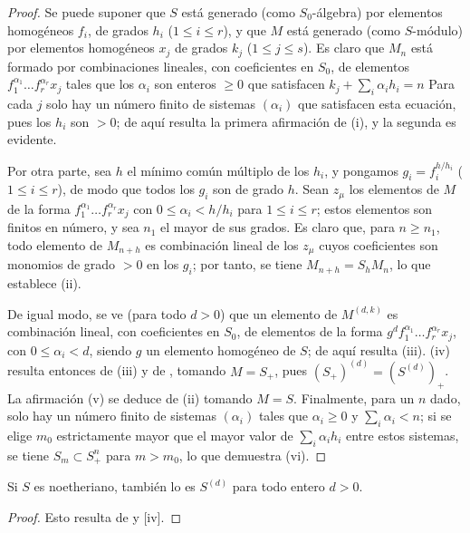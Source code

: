 \documentclass[oneside,10pt]{amsart}
\renewcommand{\leq}{\leqslant}
\renewcommand{\geq}{\geqslant}
\newcommand{\oldpage}[2][]{\marginnote{\normalfont\footnotesize\textbf{#1}~|~#2}\ignorespaces}
\let\EGAOriginalLabel\label
\renewcommand{\label}[1]{\phantomsection\EGAOriginalLabel{#1}}
\begin{document}
\begin{proof}
Se puede suponer que $S$ está generado (como $S_0$-álgebra) por elementos homogéneos $f_i$, de grados $h_i$ ($1\leq i\leq r$), y que $M$ está generado (como $S$-módulo) por elementos homogéneos $x_j$ de grados $k_j$ ($1\leq j\leq s$).
Es claro que $M_n$ está formado por combinaciones lineales,
\oldpage[II]{22}
con coeficientes en $S_0$, de elementos $f_1^{\alpha_1}\ldots f_r^{\alpha_r}x_j$ tales que los $\alpha_i$ son enteros $\geq 0$ que satisfacen
$k_j+\sum_i\alpha_i h_i=n$
Para cada $j$ solo hay un número finito de sistemas $(\alpha_i)$ que satisfacen esta ecuación, pues los $h_i$ son $>0$; de aquí resulta la primera afirmación de (i), y la segunda es evidente.

Por otra parte, sea $h$ el mínimo común múltiplo de los $h_i$, y pongamos $g_i=f_i^{h/h_i}$ ($1\leq i\leq r$), de modo que todos los $g_i$ son de grado $h$.
Sean $z_\mu$ los elementos de $M$ de la forma $f_1^{\alpha_1}\ldots f_r^{\alpha_r}x_j$ con $0\leq\alpha_i<h/h_i$ para $1\leq i\leq r$; estos elementos son finitos en número, y sea $n_1$ el mayor de sus grados.
Es claro que, para $n\geq n_1$, todo elemento de $M_{n+h}$ es combinación lineal de los $z_\mu$ cuyos coeficientes son monomios de grado $>0$ en los $g_i$; por tanto, se tiene $M_{n+h}=S_hM_n$, lo que establece (ii).

De igual modo, se ve (para todo $d>0$) que un elemento de $M^{(d,k)}$ es combinación lineal, con coeficientes en $S_0$, de elementos de la forma $g^df_1^{\alpha_1}\ldots f_r^{\alpha_r}x_j$, con $0\leq\alpha_i<d$, siendo $g$ un elemento homogéneo de $S$; de aquí resulta (iii).
(iv) resulta entonces de (iii) y de , tomando $M=S_+$, pues $(S_+)^{(d)}=(S^{(d)})_+$.
La afirmación (v) se deduce de (ii) tomando $M=S$.
Finalmente, para un $n$ dado, solo hay un número finito de sistemas $(\alpha_i)$ tales que $\alpha_i\geq 0$ y $\sum_i\alpha_i<n$; si se elige $m_0$ estrictamente mayor que el mayor valor de $\sum_i\alpha_i h_i$ entre estos sistemas, se tiene $S_m\subset S_+^n$ para $m>m_0$, lo que demuestra (vi).
\end{proof}

\begin{corollary}[2.1.7]
\label{II.2.1.7-fr}
Si $S$ es noetheriano, también lo es $S^{(d)}$ para todo entero $d>0$.
\end{corollary}

\begin{proof}
Esto resulta de  y [iv].
\end{proof}
\end{document}
